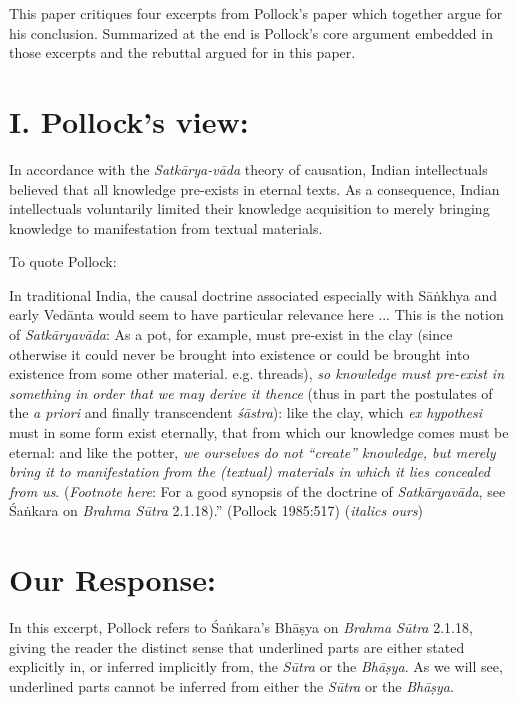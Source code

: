 This paper critiques four excerpts from Pollock's paper which together argue for his conclusion. Summarized at the end is Pollock's core argument embedded in those excerpts and the rebuttal argued for in this paper.

\section*{I. Pollock's view:}  

In accordance with the {\sl Satkārya-vāda} theory of causation, Indian intellectuals believed that all knowledge pre-exists in eternal texts. As a consequence, Indian intellectuals voluntarily limited their knowledge acquisition to merely bringing knowledge to manifestation from textual materials.

\newpage

To quote Pollock:
\begin{myquote}
In traditional India, the causal doctrine associated especially with Sāṅkhya and early Vedānta would seem to have particular relevance here ... This is the notion of {\sl Satkāryavāda}: As a pot, for example, must pre-exist in the clay (since otherwise it could never be brought into existence or could be brought into existence from some other material. e.g.  threads), {\sl so knowledge must pre-exist in something in order that we may derive it thence} (thus in part the postulates of the {\sl a priori} and finally transcendent {\sl śāstra}): like the clay, which {\sl ex hypothesi} must in some form exist eternally, that from which our knowledge comes must be eternal: and like the potter, {\sl we ourselves do not ``create'' knowledge, but merely bring it to manifestation from the (textual) materials in which it lies concealed from us}. ({\sl Footnote here}: For a good synopsis of the doctrine of {\sl Satkāryavāda}, see Śaṅkara on {\sl Brahma Sūtra} 2.1.18).''  
\hfill (Pollock 1985:517) ({\sl italics ours})
\end{myquote}

\section*{Our Response:}

In this excerpt, Pollock refers to Śaṅkara's Bhāṣya on {\sl Brahma Sūtra} 2.1.18, giving the reader the distinct sense that underlined parts are either stated explicitly in, or inferred implicitly from, the {\sl Sūtra} or the {\sl Bhāṣya}.  As we will see, underlined parts cannot be inferred from either the {\sl Sūtra} or the {\sl Bhāṣya}.

